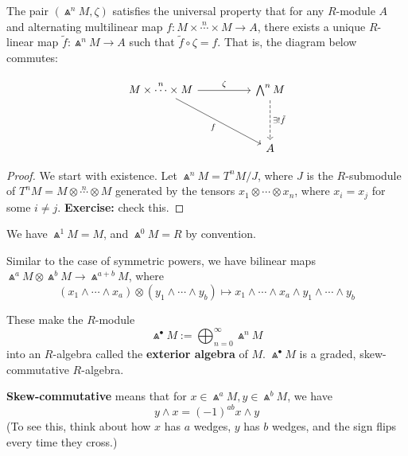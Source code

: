 \begin{thm}
    The pair $(\Wedge^nM,\zeta)$ satisfies the universal property that for any $R$-module $A$ and alternating multilinear map $f:M \times \overset{n}{\cdots} \times M \to A$, there exists a unique $R$-linear map $\tilde f : \Wedge^nM \to A$ such that $\tilde f \circ \zeta = f$. That is, the diagram below commutes:

    \[\begin{tikzcd}[ampersand replacement=\&]
    	{M \times\overset{n}{\cdots}\times M} \&\& {\bigwedge ^nM} \\
    	\\
    	\&\& A
    	\arrow["\zeta", from=1-1, to=1-3]
    	\arrow["f"', from=1-1, to=3-3]
    	\arrow["{\exists ! \tilde f}", dashed, from=1-3, to=3-3]
    \end{tikzcd}\]
\end{thm}

\begin{proof}
    We start with existence. Let $\Wedge ^nM = T^nM/J$, where $J$ is the $R$-submodule of $T^nM = M \otimes \overset{n}{\cdots} \otimes M$ generated by the tensors $x_1 \otimes \cdots \otimes x_n$, where $x_i = x_j$ for some $i \neq j$. \textbf{Exercise:} check this.
\end{proof}

\begin{rmk}
    We have $\Wedge ^1 M = M$, and $\Wedge^0M = R$ by convention.
\end{rmk}

Similar to the case of symmetric powers, we have bilinear maps $\Wedge^aM \otimes \Wedge^bM  \to \Wedge^{a+b}M$, where
$$(x_1 \land \cdots \land x_a) \otimes (y_1 \wedge \cdots \wedge y_b) \mapsto x_1 \land \cdots \land x_a \land y_1 \land \cdots \land y_b$$
\begin{defn}
    These make the $R$-module
    $$\Wedge ^\bullet M := \bigoplus _{n=0}^\infty \Wedge^nM$$
    into an $R$-algebra called the \textbf{exterior algebra} of $M$. $\Wedge^\bullet M$ is a graded, skew-commutative $R$-algebra.

    \textbf{Skew-commutative} means that for $x \in \Wedge^a M,y \in \Wedge ^bM$, we have
    $$y \land x = (-1)^{ab}x \land y$$
    (To see this, think about how $x$ has $a$ wedges, $y$ has $b$ wedges, and the sign flips every time they cross.)
\end{defn}

